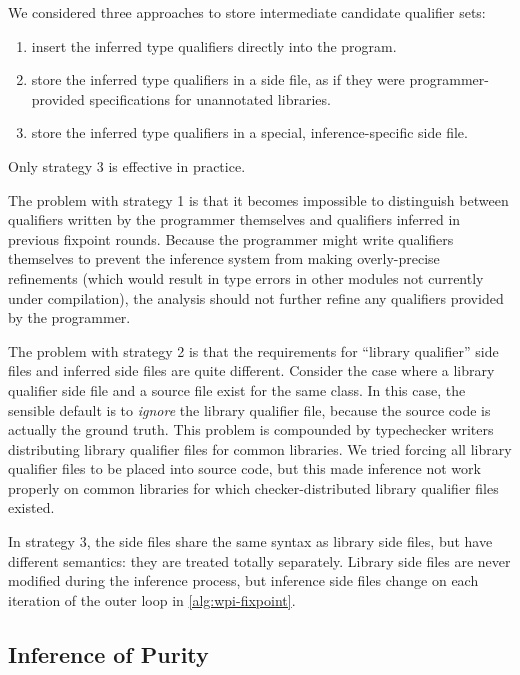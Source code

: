 We considered three approaches to store intermediate candidate qualifier sets:
\begin{enumerate}
\item insert the inferred type qualifiers directly into the program.
\item store the inferred type qualifiers in a side file, as if they were
  programmer-provided specifications for unannotated libraries.
\item store the inferred type qualifiers in a special, inference-specific
  side file.
\end{enumerate}

Only strategy 3 is effective in practice.

The problem with strategy 1 is that it becomes impossible to distinguish
between qualifiers written by the programmer themselves and qualifiers
inferred in previous fixpoint rounds. Because the programmer might write
qualifiers themselves to prevent the inference system from making overly-precise
refinements (which would result in type errors in \eg other modules not currently
under compilation), the analysis should not further refine any qualifiers
provided by the programmer.

The problem with strategy 2 is that
the requirements for ``library qualifier'' side files and inferred side files
are quite different. Consider the case where a library qualifier side file and
a source file exist for the same class. In this case, the sensible default is
to \emph{ignore} the library qualifier file, because the source code is actually
the ground truth. This problem is compounded by typechecker writers distributing
library qualifier files for common libraries. We tried forcing
all library qualifier files to be placed into source code, but this made inference
not work properly on common libraries for which checker-distributed library qualifier files
existed.

In strategy 3, the side files share the same syntax as library side files, but
have different semantics: they are treated totally separately. Library side files
are never modified during the inference process, but inference side files change
on each iteration of the outer loop in \cref{alg:wpi-fixpoint}.

\subsection{Inference of Purity}
\label{sec:purity-inference}


